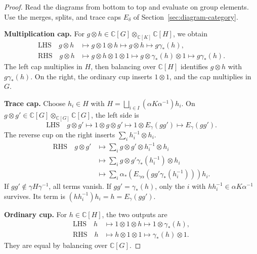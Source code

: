 \documentclass[11pt,a4paper]{article}
\numberwithin{equation}{section}
\theoremstyle{definition}
\newcommand{\C}{\mathbb C}
\begin{document}
\begin{proof}
Read the diagrams from bottom to top and evaluate on group elements.
Use the merges, splits, and trace caps \(E_\delta\) of
Section~\ref{sec:diagram-category}.

\textbf{Multiplication cap.}
For \(g\otimes h\in\C[G]\otimes_{\C[K]}\C[H]\), we obtain
\[
\begin{aligned}
\text{LHS}\quad g\otimes h
 &\longmapsto g\otimes1\otimes h
 \longmapsto g\otimes h
 \longmapsto g\gamma_*(h),\\
\text{RHS}\quad g\otimes h
 &\longmapsto g\otimes h\otimes1\otimes1
 \longmapsto g\otimes\gamma_*(h)\otimes1
 \longmapsto g\gamma_*(h).
\end{aligned}
\]
The left cap multiplies in \(H\), then balancing over \(\C[H]\)
identifies \(g\otimes h\) with \(g\gamma_*(h)\). On the right, the
ordinary cup inserts \(1\otimes1\), and the cap multiplies in \(G\).

\textbf{Trace cap.}
Choose \(h_i\in H\) with
\(H=\bigsqcup_{i\in I}(\alpha K\alpha^{-1})h_i\).
On \(g\otimes g'\in\C[G]\otimes_{\C[G]}\C[G]\), the left side is
\[
\text{LHS}\quad g\otimes g'
 \longmapsto 1\otimes g\otimes g'
 \longmapsto 1\otimes E_\gamma(gg')
 \longmapsto E_\gamma(gg').
\]
The reverse cup on the right inserts \(\sum_i h_i^{-1}\otimes h_i\).
\[
\begin{aligned}
\text{RHS}\quad g\otimes g'
 &\longmapsto \sum_i g\otimes g'\otimes h_i^{-1}\otimes h_i\\
 &\longmapsto \sum_i g\otimes g'\gamma_*(h_i^{-1})\otimes h_i\\
 &\longmapsto \sum_i
    \alpha_*\!\left(E_{\gamma\alpha}
        (gg'\gamma_*(h_i^{-1}))\right)h_i.
\end{aligned}
\]
If \(gg'\notin\gamma H\gamma^{-1}\), all terms vanish. If
\(gg'=\gamma_*(h)\), only the \(i\) with
\(hh_i^{-1}\in\alpha K\alpha^{-1}\) survives. Its term is
\((hh_i^{-1})h_i=h=E_\gamma(gg')\).

\textbf{Ordinary cup.}
For \(h\in\C[H]\), the two outputs are
\[
\begin{aligned}
\text{LHS}\quad h
 &\longmapsto 1\otimes1\otimes h
 \longmapsto 1\otimes\gamma_*(h),\\
\text{RHS}\quad h
 &\longmapsto h\otimes1\otimes1
 \longmapsto \gamma_*(h)\otimes1.
\end{aligned}
\]
They are equal by balancing over \(\C[G]\).


\end{proof}
\end{document}
